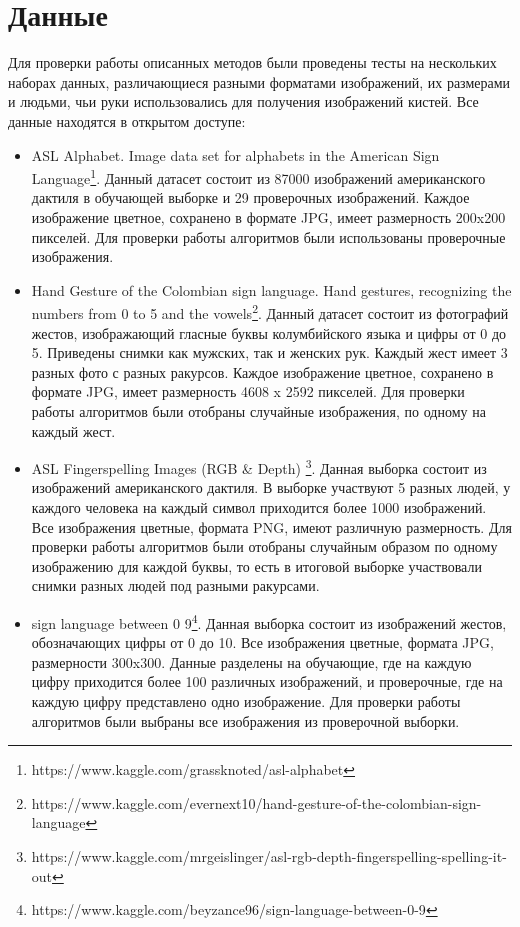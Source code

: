 \section{Данные}
\label{sec:Data}

Для проверки работы описанных методов были проведены тесты на нескольких наборах данных, различающиеся разными форматами изображений, их размерами и людьми, чьи руки использовались для получения изображений кистей. Все данные находятся в открытом доступе:

\begin{itemize}
	\item ASL Alphabet. Image data set for alphabets in the American Sign Language\footnote{https://www.kaggle.com/grassknoted/asl-alphabet}. Данный датасет состоит из 87000 изображений американского дактиля в обучающей выборке и 29 проверочных изображений. Каждое изображение цветное, сохранено в формате JPG, имеет размерность 200x200 пикселей. Для проверки работы алгоритмов были использованы проверочные изображения.
	
	\item Hand Gesture of the Colombian sign language. Hand gestures, recognizing the numbers from 0 to 5 and the vowels\footnote{https://www.kaggle.com/evernext10/hand-gesture-of-the-colombian-sign-language}. Данный датасет состоит из фотографий жестов, изображающий гласные буквы колумбийского языка и цифры от 0 до 5. Приведены снимки как мужских, так и женских рук. Каждый жест имеет 3 разных фото с разных ракурсов. Каждое изображение цветное, сохранено в формате JPG, имеет размерность 4608 x 2592 пикселей. Для проверки работы алгоритмов были отобраны случайные изображения, по одному на каждый жест.
	
	\item ASL Fingerspelling Images (RGB \& Depth) \footnote{https://www.kaggle.com/mrgeislinger/asl-rgb-depth-fingerspelling-spelling-it-out}. Данная выборка состоит из изображений американского дактиля. В выборке участвуют 5 разных людей, у каждого человека на каждый символ приходится более 1000 изображений. Все изображения цветные, формата PNG, имеют различную размерность. Для проверки работы алгоритмов были отобраны случайным образом по одному изображению для каждой буквы, то есть в итоговой выборке участвовали снимки разных людей под разными ракурсами.
	
	\item sign language between 0 9\footnote{https://www.kaggle.com/beyzance96/sign-language-between-0-9}. Данная выборка состоит из изображений жестов, обозначающих цифры от 0 до 10. Все изображения цветные, формата JPG, размерности 300x300. Данные разделены на обучающие, где на каждую цифру приходится более 100 различных изображений, и проверочные, где на каждую цифру представлено одно изображение. Для проверки работы алгоритмов были выбраны все изображения из проверочной выборки. 
	
\end{itemize}